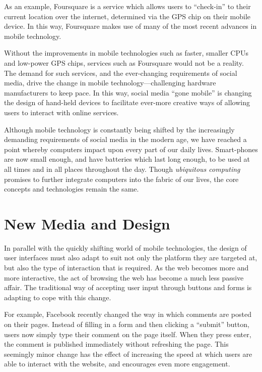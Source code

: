 \documentclass[a4paper,11pt]{article}
\begin{document}
    As an example, Foursquare is a service which allows users to ``check-in''
    to their current location over the internet, determined via the GPS chip on
    their mobile device. In this way, Foursquare makes use of many of the most
    recent advances in mobile technology.

    Without the improvements in mobile technologies such as faster, smaller
    CPUs and low-power GPS chips, services such as Foursquare would not be
    a reality. The demand for such services, and the ever-changing requirements
    of social media, drive the change in mobile technology---challenging
    hardware manufacturers to keep pace. In this way, social media ``gone
    mobile'' is changing the design of hand-held devices to facilitate
    ever-more creative ways of allowing users to interact with online services.

    Although mobile technology is constantly being shifted by the increasingly
    demanding requirements of social media in the modern age, we have reached
    a point whereby computers impact upon every part of our daily lives.
    Smart-phones are now small enough, and have batteries which last long
    enough, to be used at all times and in all places throughout the day.
    Though \emph{ubiquitous computing} promises to further integrate computers
    into the fabric of our lives, the core concepts and technologies remain the
    same.

    \section{New Media and Design}

    In parallel with the quickly shifting world of mobile technologies, the
    design of user interfaces must also adapt to suit not only the platform
    they are targeted at, but also the type of interaction that is required. As
    the web becomes more and more interactive, the act of browsing the web has
    become a much less passive affair. The traditional way of accepting user
    input through buttons and forms is adapting to cope with this change.

    For example, Facebook recently changed the way in which comments are posted
    on their pages. Instead of filling in a form and then clicking a ``submit''
    button, users now simply type their comment on the page itself. When they
    press enter, the comment is published immediately without refreshing the
    page. This seemingly minor change has the effect of increasing the speed at
    which users are able to interact with the website, and encourages even more
    engagement.
\end{document}

